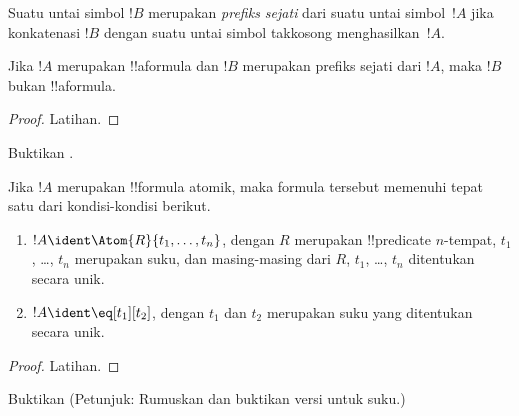 \documentclass[../../../include/open-logic-section]{subfiles}
\begin{document}
\begin{defn}
Suatu untai simbol $!B$ merupakan \emph{prefiks sejati} dari suatu untai
simbol~$!A$ jika konkatenasi $!B$ dengan suatu untai simbol takkosong
menghasilkan~$!A$.
\end{defn}

\begin{lem}
Jika $!A$ merupakan !!a{formula} dan $!B$ merupakan prefiks sejati dari
$!A$, maka $!B$ bukan !!a{formula}.
\end{lem}

\begin{proof}
Latihan.
\end{proof}

\begin{prob}
Buktikan .
\end{prob}

\begin{prop}
Jika $!A$ merupakan !!{formula} atomik, maka formula tersebut memenuhi tepat
satu dari kondisi-kondisi berikut.
\begin{enumerate}
\item $!A \ident \Atom{R}{t_1,\dots,t_n}$, dengan $R$ merupakan
  !!{predicate} $n$-tempat, $t_1$, \dots, $t_n$ merupakan suku, dan
  masing-masing dari $R$, $t_1$, \dots, $t_n$ ditentukan secara unik.
\item $!A \ident \eq[t_1][t_2]$, dengan $t_1$ dan $t_2$ merupakan suku
  yang ditentukan secara unik.
\end{enumerate}
\end{prop}

\begin{proof}
Latihan.
\end{proof}

\begin{prob}
Buktikan  (Petunjuk: Rumuskan dan
buktikan versi  untuk suku.)
\end{prob}
\end{document}
